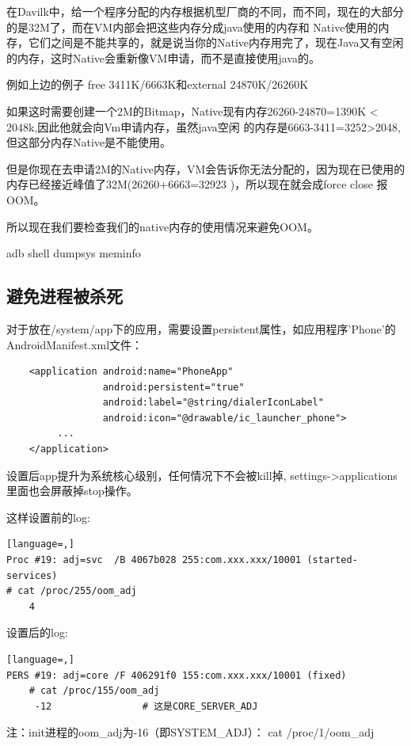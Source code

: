 \documentclass[a4paper, 11pt]{article}
\begin{document}
在Davilk中，给一个程序分配的内存根据机型厂商的不同，而不同，现在的大部分的是32M了，而在VM内部会把这些内存分成java使用的内存和 Native使用的内存，它们之间是不能共享的，就是说当你的Native内存用完了，现在Java又有空闲的内存，这时Native会重新像VM申请，而不是直接使用java的。

例如上边的例子
free 3411K/6663K和external 24870K/26260K

如果这时需要创建一个2M的Bitmap，Native现有内存26260-24870=1390K < 2048k,因此他就会向Vm申请内存，虽然java空闲
的内存是6663-3411=3252>2048,但这部分内存Native是不能使用。

但是你现在去申请2M的Native内存，VM会告诉你无法分配的，因为现在已使用的内存已经接近峰值了32M(26260+6663=32923 )，所以现在就会成force close 报OOM。

所以现在我们要检查我们的native内存的使用情况来避免OOM。

adb shell dumpsys meminfo 

\subsection{避免进程被杀死}
对于放在/system/app下的应用，需要设置persistent属性，如应用程序'Phone'的AndroidManifest.xml文件：
\begin{lstlisting}
    <application android:name="PhoneApp"
                 android:persistent="true"
                 android:label="@string/dialerIconLabel"
                 android:icon="@drawable/ic_launcher_phone">
         ...
    </application>
\end{lstlisting}
设置后app提升为系统核心级别，任何情况下不会被kill掉, settings->applications里面也会屏蔽掉stop操作。

这样设置前的log:  
\begin{lstlisting}[language=,]
Proc #19: adj=svc  /B 4067b028 255:com.xxx.xxx/10001 (started-services)
# cat /proc/255/oom_adj
    4
\end{lstlisting}
设置后的log:
\begin{lstlisting}[language=,]
PERS #19: adj=core /F 406291f0 155:com.xxx.xxx/10001 (fixed)
    # cat /proc/155/oom_adj
     -12                # 这是CORE_SERVER_ADJ
\end{lstlisting}
注：init进程的oom_adj为-16（即SYSTEM_ADJ）：
cat  /proc/1/oom_adj
\end{document}
